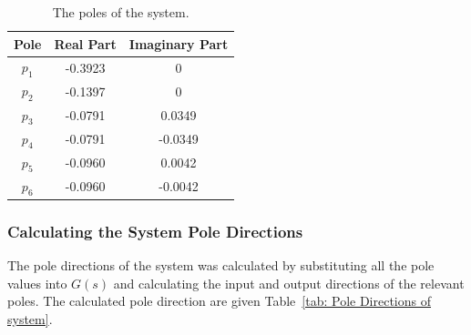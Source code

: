 \begin{table}[H]
	\centering
	\caption{The poles of the system.}
	\begin{tabular}{ccc}
		\hline
		\textbf{Pole} & \textbf{Real Part} & \textbf{Imaginary Part} \\\hline
		$p_1$            & -0.3923            & 0                       \\
		$p_2$            & -0.1397            & 0                       \\
		$p_3$            & -0.0791            & 0.0349                  \\
		$p_4$            & -0.0791            & -0.0349                 \\
		$p_5$            & -0.0960             & 0.0042                  \\
		$p_6$            & -0.0960             & -0.0042   \\\hline             
	\end{tabular}
	\label{tab: Poles of system}
\end{table}

\subsubsection{Calculating the System Pole Directions}

The pole directions of the system was calculated by substituting all the pole values into $G(s)$ and calculating the input and output directions of the relevant poles. The calculated pole direction are given Table~\ref{tab: Pole Directions of system}.

